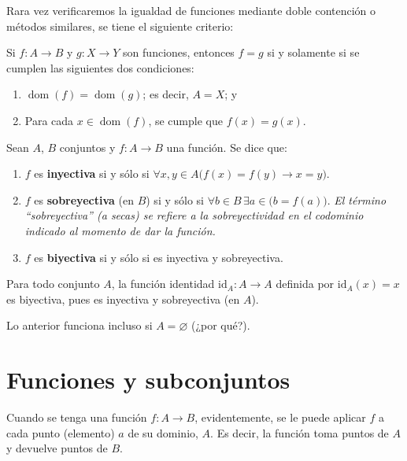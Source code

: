 \documentclass[letterpaper,DIV=14,headsepline,12pt]{scrartcl}
\newcommand{\id}{\mathrm{id}}
\renewcommand{\emptyset}{\varnothing}
\DeclareMathOperator{\dom}{dom}
\begin{document}
    Rara vez verificaremos la igualdad de funciones mediante doble contención o métodos similares, se tiene el siguiente criterio:

    \begin{recordatorio}
        Si $f:A \to B$ y $g:X \to Y$ son funciones, entonces $f=g$ si y solamente si se cumplen las siguientes dos condiciones:
        \begin{enumerate}
            \item $\dom(f)=\dom(g)$; es decir, $A=X$; y
            \item Para cada $x \in \dom(f)$, se cumple que $f(x)=g(x)$.
        \end{enumerate}
    \end{recordatorio}

    \begin{definicion}
        Sean $A$, $B$ conjuntos y $f: A \to B$ una función. Se dice que:
        \begin{enumerate}
            \item $f$ es \textbf{inyectiva} si y sólo si $\forall x,y \in A \big( f(x)=f(y) \to x=y \big)$.
            \item $f$ es \textbf{sobreyectiva} (en $B$) si y sólo si $\forall b \in B \, \exists a \in \big( b=f(a) \big)$. \textit{El término ``sobreyectiva'' (a secas) se refiere a la sobreyectividad en el codominio indicado al momento de dar la función.}
            \item $f$ es \textbf{biyectiva} si y sólo si es inyectiva y sobreyectiva.
        \end{enumerate}
    \end{definicion}

    \begin{observacion}
        Para todo conjunto $A$, la función identidad $\id_A:A \to A$ definida por $\id_A(x)=x$ es biyectiva, pues es inyectiva y sobreyectiva (en $A$).

        Lo anterior funciona incluso si $A=\emptyset$ (¿por qué?).
    \end{observacion}

    

    \section{Funciones y subconjuntos}

    Cuando se tenga una función $f:A \to B$, evidentemente, se le puede aplicar $f$ a cada punto (elemento) $a$ de su dominio, $A$. Es decir, la función toma puntos de $A$ y devuelve puntos de $B$.
    
\end{document}
